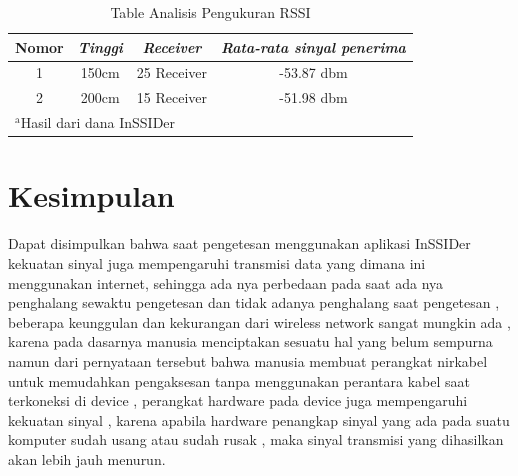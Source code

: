 \documentclass[conference]{IEEEtran}
\begin{document}
\begin{table}[htbp]
    \caption{Table Analisis Pengukuran RSSI}
    \begin{center}
    \begin{tabular}{|c|c|c|c|}
        \hline
    \textbf{Nomor} & \textbf{\textit{Tinggi}}& \textbf{\textit{Receiver}}& \textbf{\textit{Rata-rata sinyal penerima}} \\
    \hline
    1 & 150cm& 25 Receiver & -53.87 dbm  \\
    \hline
    2 & 200cm& 15 Receiver & -51.98 dbm  \\
    \hline
    \multicolumn{4}{l}{$^{\mathrm{a}}$Hasil dari dana InSSIDer}
    \end{tabular}
    \label{tab2}
    \end{center}
    \end{table}

\section{Kesimpulan}
Dapat disimpulkan bahwa saat pengetesan menggunakan aplikasi InSSIDer kekuatan sinyal juga mempengaruhi transmisi data yang dimana ini menggunakan internet,
sehingga ada nya perbedaan pada saat ada nya penghalang sewaktu pengetesan dan tidak adanya penghalang saat pengetesan , beberapa keunggulan dan kekurangan dari wireless network 
sangat mungkin ada , karena pada dasarnya manusia menciptakan sesuatu hal yang belum sempurna namun dari pernyataan tersebut bahwa manusia membuat perangkat nirkabel untuk memudahkan pengaksesan 
tanpa menggunakan perantara kabel saat terkoneksi di device , perangkat hardware pada device juga mempengaruhi kekuatan sinyal , karena apabila hardware penangkap sinyal yang ada pada suatu komputer sudah usang atau sudah rusak , maka sinyal transmisi yang dihasilkan akan lebih jauh menurun.



\end{document}
